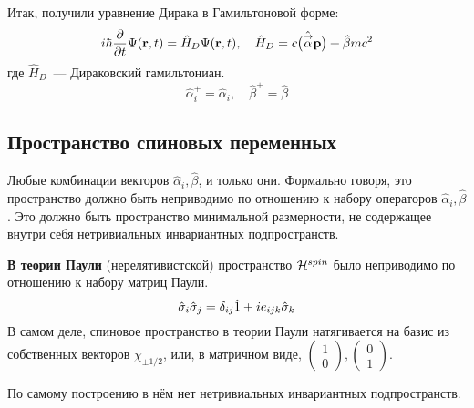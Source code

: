 
Итак, получили уравнение Дирака в Гамильтоновой форме:
$$
    i \hbar \dfrac{\partial }{\partial t} \Psi(\mathbf r, t) = \hat H_D \Psi(\mathbf r, t), \quad \hat H_D = c \big(\hat{\overset{\to}{\alpha}} \mathbf p
    \big) + \hat\beta mc^2
$$
где $\hat H_D$~--- Дираковский гамильтониан.
$$
    \hat \alpha_i^+ = \hat \alpha_i, \quad \hat \beta^+ = \hat \beta
$$

\subsection{Пространство спиновых переменных}


\Ans Любые комбинации векторов $\hat \alpha_i, \hat \beta$, и только они. Формально говоря, это пространство должно быть неприводимо по отношению к набору операторов $\hat \alpha_i, \hat \beta$.  Это должно быть пространство минимальной размерности, не содержащее внутри себя нетривиальных инвариантных подпространств.

\textbf{В теории Паули} (нерелятивистской) пространство $\mathcal H^{spin}$ было неприводимо по отношению к набору матриц Паули.
$$
    \hat \sigma_i \hat \sigma_j = \delta_{ij} \hat 1 + i e_{ijk} \hat \sigma_k
$$
В самом деле, спиновое пространство в теории Паули натягивается на базис из собственных векторов $\chi_{\pm 1/2}$, или, в матричном виде, $\left(\begin{array}{c}
                          1 \\
                          0
                        \end{array}\right), \left(\begin{array}{c}
                          0 \\
                          1
                        \end{array}\right)
$.

По самому построению в нём нет нетривиальных инвариантных подпространств.

